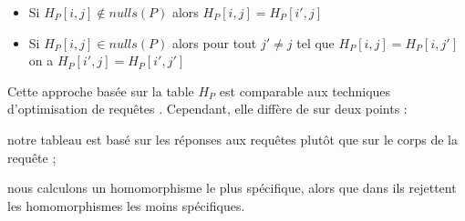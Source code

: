 \begin{itemize}
	\item Si $H_P[i, j] \notin nulls(P)$ alors $H_P[i, j] = H_P[i', j]$
	\item Si $H_P[i, j] \in nulls(P)$ alors pour tout $j' \neq j$ tel que $H_P[i, j] = H_P[i, j']$ on a $H_P[i', j] = H_P[i', j']$
\end{itemize}

\begin{example}
	
\end{example}

Cette approche basée sur la table $H_P $ est comparable aux techniques d'optimisation de requêtes \cite{}.
Cependant, elle diffère de \cite{ahoEfficientOptimizationClass1979,chandraOptimalImplementationConjunctive1977} sur deux points :
\begin{enumerate*}[label=(\roman*)]
	\item notre tableau est basé sur les réponses aux requêtes plutôt que sur le corps de la requête ;
	\item nous calculons un homomorphisme le plus spécifique, alors que dans \cite{ahoEfficientOptimizationClass1979} ils rejettent les homomorphismes les moins spécifiques.
\end{enumerate*}
